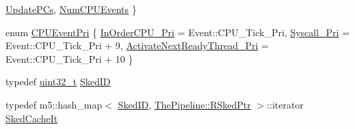 \begin{DoxyCompactItemize}
\hyperlink{classInOrderCPU_aedc081b7a3ef1b1568e62dec4a64c1caad365b9a495b45da54884ffdbbc99e40a}{UpdatePCs}, 
\hyperlink{classInOrderCPU_aedc081b7a3ef1b1568e62dec4a64c1caa85f33d9118a810839bc9175f0f351076}{NumCPUEvents}
 \}
\item 
enum \hyperlink{classInOrderCPU_a4381feb1878b9c1ea6f5dd3eed8d3197}{CPUEventPri} \{ \hyperlink{classInOrderCPU_a4381feb1878b9c1ea6f5dd3eed8d3197a81856d43a7cea886b3eb88f1392ba3fb}{InOrderCPU\_\-Pri} =  Event::CPU\_\-Tick\_\-Pri, 
\hyperlink{classInOrderCPU_a4381feb1878b9c1ea6f5dd3eed8d3197a6857abbd38f98a454eb5b1e13d70cfa4}{Syscall\_\-Pri} =  Event::CPU\_\-Tick\_\-Pri + 9, 
\hyperlink{classInOrderCPU_a4381feb1878b9c1ea6f5dd3eed8d3197a3bb59ff5e590b6f8be858dae8cd29cf2}{ActivateNextReadyThread\_\-Pri} =  Event::CPU\_\-Tick\_\-Pri + 10
 \}
\item 
typedef \hyperlink{Type_8hh_a435d1572bf3f880d55459d9805097f62}{uint32\_\-t} \hyperlink{classInOrderCPU_a630137ef811336d3ee312e01adb43991}{SkedID}
\item 
typedef m5::hash\_\-map$<$ \hyperlink{classInOrderCPU_a630137ef811336d3ee312e01adb43991}{SkedID}, \hyperlink{classResourceSked}{ThePipeline::RSkedPtr} $>$::iterator \hyperlink{classInOrderCPU_ade41d453959a2fd39fc8e5ddeea16e0e}{SkedCacheIt}
\end{DoxyCompactItemize}

